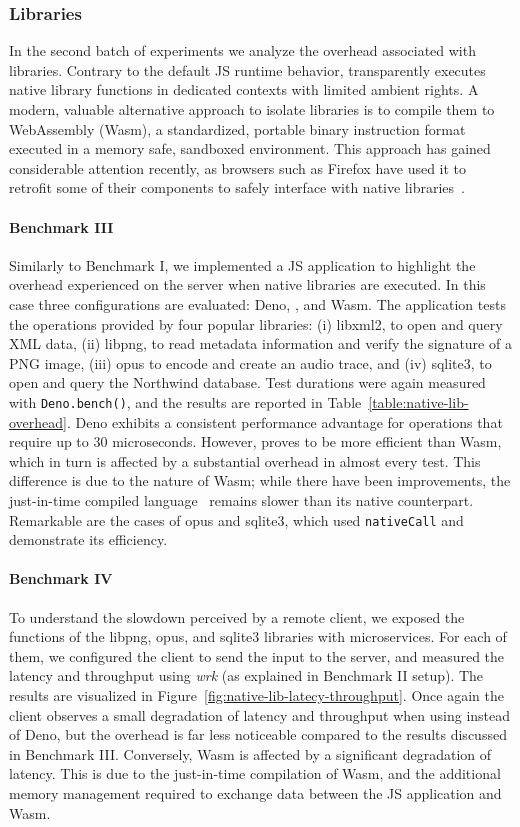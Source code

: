 \subsubsection{Libraries}

In the second batch of experiments we analyze the overhead associated
with libraries. Contrary to the default JS runtime behavior, \natisand
transparently executes native library functions in dedicated contexts
with limited ambient rights. A modern, valuable alternative approach
to isolate libraries is to compile them to WebAssembly (Wasm), a
standardized, portable binary instruction format executed in a memory
safe, sandboxed environment. This approach has gained considerable
attention recently, as browsers such as Firefox have used it to
retrofit some of their components to safely interface with native
libraries~\cite{RLBox}.

\paragraph{Benchmark III}
%
Similarly to Benchmark I, we implemented a JS application to highlight
the overhead experienced on the server when native libraries are
executed. In this case three configurations are evaluated: Deno, \natisand,
and Wasm. The application tests the operations provided by four
popular libraries: (i) libxml2, to open and query XML data, (ii) libpng, to read metadata information and verify the
signature of a PNG image, (iii) opus to encode and create an audio
trace, and (iv) sqlite3, to open and query the Northwind
database. Test durations were again measured with {\tt Deno.bench()},
and the results are reported in
Table~\ref{table:native-lib-overhead}. Deno
exhibits a consistent performance advantage for operations that
require up to 30 microseconds. However, \natisand proves to be more
efficient than Wasm, which in turn is affected by a substantial
overhead in almost every test. This difference is due to the nature of
Wasm; while there have been improvements, the just-in-time
compiled language~\cite{wasm-compilation-pipeline}
remains slower than its native counterpart. Remarkable are the cases
of opus and sqlite3, which used {\tt nativeCall} and demonstrate its
efficiency.

\paragraph{Benchmark IV}
%
To understand the slowdown perceived by a remote client, we exposed
the functions of the libpng, opus, and sqlite3 libraries with
microservices. For each of them, we configured the client to send the
input to the server, and measured the latency and throughput using
{\em wrk} (as explained in Benchmark II setup). The results are
visualized in Figure~\ref{fig:native-lib-latecy-throughput}. Once
again the client observes a small degradation of
latency and throughput when using \natisand instead of Deno, but the
overhead is far less noticeable compared to the results discussed in
Benchmark III. Conversely, Wasm is affected by a significant
degradation of latency. This is due to the just-in-time compilation of Wasm, and the additional memory
management required to exchange data between the JS application and
Wasm.

